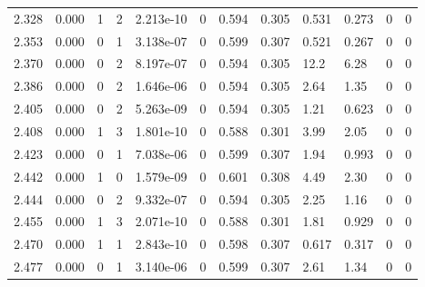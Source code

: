 \documentclass[preview]{standalone}
\begin{document}
{{{{{\begin{tabular}{L{1.2cm}C{1.2cm} C{0.3cm}C{0.5cm} C{1.4cm}C{1.4cm} C{1.4cm}C{1.4cm} C{1.6cm}C{1.6cm} C{1.6cm}C{1.6cm}}
  2.328  &  0.000  & 1     &  2 &  2.213e-10  & 0  &  0.594&   0.305& 0.531 & 0.273   &  0 & 0  \\ 
  2.353  &  0.000  & 0     &  1 &  3.138e-07  & 0  &  0.599&   0.307& 0.521 & 0.267   &  0 & 0  \\ 
  2.370  &  0.000  & 0     &  2 &  8.197e-07  & 0  &  0.594&   0.305& 12.2 & 6.28   &  0 & 0  \\ 
  2.386  &  0.000  & 0     &  2 &  1.646e-06  & 0  &  0.594&   0.305& 2.64 & 1.35   &  0 & 0  \\ 
  2.405  &  0.000  & 0     &  2 &  5.263e-09  & 0  &  0.594&   0.305& 1.21 & 0.623   &  0 & 0  \\ 
  2.408  &  0.000  & 1     &  3 &  1.801e-10  & 0  &  0.588&   0.301& 3.99 & 2.05   &  0 & 0  \\ 
  2.423  &  0.000  & 0     &  1 &  7.038e-06  & 0  &  0.599&   0.307& 1.94 & 0.993   &  0 & 0  \\ 
  2.442  &  0.000  & 1     &  0 &  1.579e-09  & 0  &  0.601&   0.308& 4.49 & 2.30   &  0 & 0  \\ 
  2.444  &  0.000  & 0     &  2 &  9.332e-07  & 0  &  0.594&   0.305& 2.25 & 1.16   &  0 & 0  \\ 
  2.455  &  0.000  & 1     &  3 &  2.071e-10  & 0  &  0.588&   0.301& 1.81 & 0.929   &  0 & 0  \\ 
  2.470  &  0.000  & 1     &  1 &  2.843e-10  & 0  &  0.598&   0.307& 0.617 & 0.317   &  0 & 0  \\ 
  2.477  &  0.000  & 0     &  1 &  3.140e-06  & 0  &  0.599&   0.307& 2.61 & 1.34   &  0 & 0  \\ 
\hline 
\end{tabular} 

}}}}}
\end{document}
